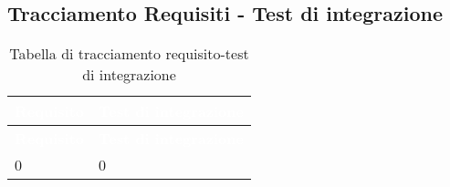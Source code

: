 \subsection{Tracciamento Requisiti - Test di integrazione}
{
\renewcommand{\arraystretch}{1.5}
\centering
\begin{longtable}{C{4cm} C{4cm}}
\caption{Tabella di tracciamento requisito-test di integrazione}\\
\textcolor{white}{\textbf{Requisito}} & \textcolor{white}{\textbf{Test di integrazione}}\\	
\endfirsthead
{}
\textcolor{white}{\textbf{Requisito}} & \textcolor{white}{\textbf{Test di integrazione}}\\	
\endhead

0 & 0  \\

\end{longtable}
}